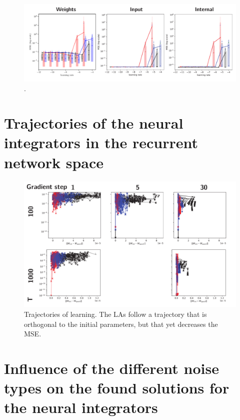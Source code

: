 \documentclass{article} %
\newcounter{ct}
\theoremstyle{definition}
\theoremstyle{remark}
\begin{document}
\begin{figure}[H]
     \centering
    \includegraphics[width=\textwidth]{all_lrs_vs_mses_f1}
       \caption{.}
         \label{fig:all_lrs_vs_mses}
\end{figure}

\section{Trajectories of the neural integrators in the recurrent network space}

\begin{figure}[H]
     \centering
    \includegraphics[width=\textwidth]{wdn_mse_trajectories_F1}
       \caption{Trajectories of learning. The LAs follow a trajectory that is orthogonal to the initial parameters, but that yet decreases the MSE.}
         \label{fig:wdn_mse_trajectories_F1}
\end{figure}

\section{Influence of the different noise types on the found solutions for the neural integrators}
\end{document}
